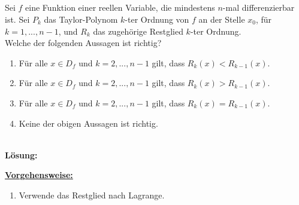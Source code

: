 \subsection*{}
Sei $ f $ eine Funktion einer reellen Variable, die mindestens $ n $-mal differenzierbar ist.
Sei $ P_k $ das Taylor-Polynom $ k $-ter Ordnung von $ f $ an der Stelle $ x_0 $, für $ k = 1,...,n-1 $, und $ R_k $ das zugehörige Restglied $ k $-ter Ordnung.\\
Welche der folgenden Aussagen ist richtig? 
\renewcommand{\labelenumi}{(\alph{enumi})}
\begin{enumerate}
	\item 
	Für alle $ x \in D_f $ und $  k = 2,...,n-1 $ gilt,
	dass $ R_k(x) < R_{k-1}(x) $.
	\item
	Für alle $ x \in D_f $ und $  k = 2,...,n-1 $ gilt,
	dass $ R_k(x) > R_{k-1}(x) $.
	
	\item
	Für alle $ x \in D_f $ und $  k = 2,...,n-1 $ gilt,
	dass $ R_k(x) = R_{k-1}(x) $.
	\item
	Keine der obigen Aussagen ist richtig.
\end{enumerate}
\ \\
\textbf{Lösung:}
\begin{mdframed}
	\underline{\textbf{Vorgehensweise:}}
	\renewcommand{\labelenumi}{\theenumi.}
	\begin{enumerate}
		\item Verwende das Restglied nach Lagrange.
	\end{enumerate}
\end{mdframed}

